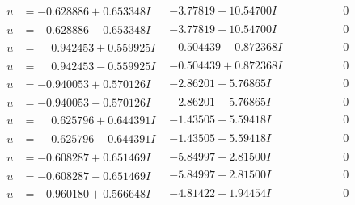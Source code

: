 \documentclass[1p]{elsarticle_modified}
\theoremstyle{definition}
\begin{document}
$$\begin{array}{c|c|c}
\begin{aligned}
u &= -0.628886 + 0.653348 I\end{aligned}
 & -3.77819 - 10.54700 I & \phantom{-0.000000 } 0 \\ \hline\begin{aligned}
u &= -0.628886 - 0.653348 I\end{aligned}
 & -3.77819 + 10.54700 I & \phantom{-0.000000 } 0 \\ \hline\begin{aligned}
u &= \phantom{-}0.942453 + 0.559925 I\end{aligned}
 & -0.504439 - 0.872368 I & \phantom{-0.000000 } 0 \\ \hline\begin{aligned}
u &= \phantom{-}0.942453 - 0.559925 I\end{aligned}
 & -0.504439 + 0.872368 I & \phantom{-0.000000 } 0 \\ \hline\begin{aligned}
u &= -0.940053 + 0.570126 I\end{aligned}
 & -2.86201 + 5.76865 I & \phantom{-0.000000 } 0 \\ \hline\begin{aligned}
u &= -0.940053 - 0.570126 I\end{aligned}
 & -2.86201 - 5.76865 I & \phantom{-0.000000 } 0 \\ \hline\begin{aligned}
u &= \phantom{-}0.625796 + 0.644391 I\end{aligned}
 & -1.43505 + 5.59418 I & \phantom{-0.000000 } 0 \\ \hline\begin{aligned}
u &= \phantom{-}0.625796 - 0.644391 I\end{aligned}
 & -1.43505 - 5.59418 I & \phantom{-0.000000 } 0 \\ \hline\begin{aligned}
u &= -0.608287 + 0.651469 I\end{aligned}
 & -5.84997 - 2.81500 I & \phantom{-0.000000 } 0 \\ \hline\begin{aligned}
u &= -0.608287 - 0.651469 I\end{aligned}
 & -5.84997 + 2.81500 I & \phantom{-0.000000 } 0 \\ \hline\begin{aligned}
u &= -0.960180 + 0.566648 I\end{aligned}
 & -4.81422 - 1.94454 I & \phantom{-0.000000 } 0 \\ \hline\begin{aligned}

\end{aligned}
\end{array}$$
\end{document}
